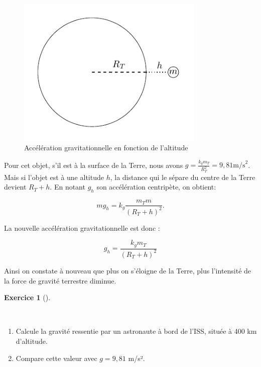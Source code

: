 \documentclass[
  letterpaper,
  DIV=11,
  numbers=noendperiod]{scrartcl}
\providecommand{\tightlist}{%
  \setlength{\itemsep}{0pt}\setlength{\parskip}{0pt}}\usepackage{longtable,booktabs,array}
\theoremstyle{definition}
\newtheorem{exercise}{Exercice}[section]
\theoremstyle{definition}
\theoremstyle{definition}
\theoremstyle{remark}
\begin{document}
\begin{figure}[H]

{\centering \includegraphics[width=0.8\textwidth,height=\textheight]{figures/grav/fig5.pdf}

}

\caption{Accélération gravitationnelle en fonction de l'altitude}

\end{figure}%

Pour cet objet, s'il est à la surface de la Terre, nous avons
\(g = \frac{k_g m_T}{R_T^2}=9,81 \text{m/s}^2\). Mais si l'objet est à
une altitude \(h\), la distance qui le sépare du centre de la Terre
devient \(R_T + h\). En notant \(g_h\) son accélération centripète, on
obtient:

\[
mg_h=k_g\dfrac{m_Tm}{(R_T+h)^2}.
\]

La nouvelle accélération gravitationnelle est donc :

\[
g_h = \frac{k_g m_T}{(R_T + h)^2}
\]

Ainsi on constate à nouveau que plus on s'éloigne de la Terre, plus
l'intensité de la force de gravité terrestre diminue.

\begin{exercise}[]\protect\hypertarget{exr-gravite-altitude}{}\label{exr-gravite-altitude}

~

\begin{enumerate}
\def\labelenumi{\arabic{enumi}.}
\tightlist
\item
  Calcule la gravité ressentie par un astronaute à bord de l'ISS, située
  à 400 km d'altitude.
\item
  Compare cette valeur avec \(g = 9,81\) m/s².
\end{enumerate}

\end{exercise}
\end{document}
